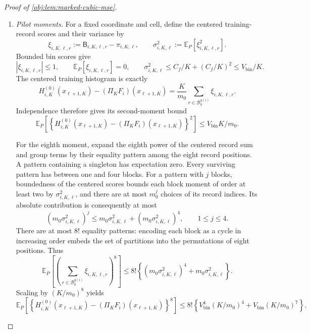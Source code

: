 \documentclass[11pt]{article}
\begin{document}
\begin{proof}[Proof of \cref{obj:lem:marked-cubic-mse}]
\begin{enumerate}
\item \textit{Pilot moments.}
For a fixed coordinate and cell, define the centered training-record scores and their variance by
\[
\xi_{i,K,\ell,r}
:=\mathsf B_{i,K,\ell,r}-\pi_{i,K,\ell},
\qquad
\sigma_{i,K,\ell}^2
:=\mathbb E_P[\xi_{i,K,\ell,r}^2].
\]
Bounded bin scores give
\[
|\xi_{i,K,\ell,r}|\le1,\qquad
\mathbb E_P[\xi_{i,K,\ell,r}]=0,\qquad
\sigma_{i,K,\ell}^2
\le C_f/K+(C_f/K)^2
\le V_{\mathrm{bin}}/K.
\]
The centered training histogram is exactly
\[
H_{i,K}^{(0)}(x_{\ell+1,K})
-(\Pi_KF_i)(x_{\ell+1,K})
=
\frac K{m_0}\sum_{r\in\mathcal B_0^{g(i)}}
\xi_{i,K,\ell,r}.
\]
Independence therefore gives its second-moment bound
\[
\mathbb E_P\!\left[
\left\{H_{i,K}^{(0)}(x_{\ell+1,K})
-(\Pi_KF_i)(x_{\ell+1,K})\right\}^2
\right]
\le V_{\mathrm{bin}}K/m_0.
\]

For the eighth moment, expand the eighth power of the centered record sum and group terms by their equality pattern among the eight record positions. A pattern containing a singleton has expectation zero. Every surviving pattern has between one and four blocks. For a pattern with \(j\) blocks, boundedness of the centered scores bounds each block moment of order at least two by \(\sigma_{i,K,\ell}^2\), and there are at most \(m_0^j\) choices of its record indices. Its absolute contribution is consequently at most
\[
(m_0\sigma_{i,K,\ell}^2)^j
\le m_0\sigma_{i,K,\ell}^2
+(m_0\sigma_{i,K,\ell}^2)^4,
\qquad 1\le j\le4.
\]
There are at most \(8!\) equality patterns: encoding each block as a cycle in increasing order embeds the set of partitions into the permutations of eight positions. Thus
\[
\mathbb E_P\!\left[
\left(\sum_{r\in\mathcal B_0^{g(i)}}\xi_{i,K,\ell,r}\right)^8
\right]
\le8!\left\{
(m_0\sigma_{i,K,\ell}^2)^4
+m_0\sigma_{i,K,\ell}^2
\right\}.
\]
Scaling by \((K/m_0)^8\) yields
\[
\mathbb E_P\!\left[
\left\{H_{i,K}^{(0)}(x_{\ell+1,K})
-(\Pi_KF_i)(x_{\ell+1,K})\right\}^8
\right]
\le8!\left\{
V_{\mathrm{bin}}^4(K/m_0)^4
+V_{\mathrm{bin}}(K/m_0)^7
\right\}.
\]


\end{enumerate}
\end{proof}
\end{document}
